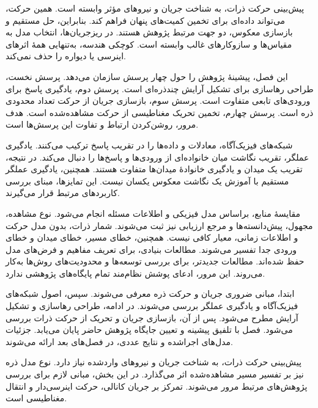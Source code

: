 \label{ch:literature-review}

\label{sec:lit-review-introduction}

پیش‌بینی حرکت ذرات، به شناخت جریان و نیروهای مؤثر وابسته است.
همین حرکت، می‌تواند داده‌ای برای تخمین کمیت‌های پنهان فراهم کند.
بنابراین، حل مستقیم و بازسازی معکوس، دو جهت مرتبط پژوهش هستند.
در ریزجریان‌ها، انتخاب مدل به مقیاس‌ها و سازوکارهای غالب وابسته است.
کوچکی هندسه، به‌تنهایی همهٔ اثرهای اینرسی یا دیواره را حذف نمی‌کند.
\cite{SquiresQuake2005}

این فصل، پیشینهٔ پژوهش را حول چهار پرسش سازمان می‌دهد.
پرسش نخست، طراحی رهاسازی برای تشکیل آرایش چندذره‌ای است.
پرسش دوم، یادگیری پاسخ برای ورودی‌های تابعی متفاوت است.
پرسش سوم، بازسازی جریان از حرکت تعداد محدودی ذره است.
پرسش چهارم، تخمین تحریک مغناطیسی از حرکت مشاهده‌شده است.
هدف مرور، روشن‌کردن ارتباط و تفاوت این پرسش‌ها است.

شبکه‌های فیزیک‌آگاه، معادلات و داده‌ها را در تقریب پاسخ ترکیب می‌کنند.
یادگیری عملگر، تقریب نگاشت میان خانواده‌ای از ورودی‌ها و پاسخ‌ها را دنبال می‌کند.
در نتیجه، تقریب یک میدان و یادگیری خانوادهٔ میدان‌ها متفاوت هستند.
همچنین، یادگیری عملگر مستقیم با آموزش یک نگاشت معکوس یکسان نیست.
این تمایزها، مبنای بررسی کاربردهای مرتبط قرار می‌گیرند.
\cite{Raissi2019PINN,Kovachki2023NeuralOperator}

مقایسهٔ منابع، براساس مدل فیزیکی و اطلاعات مسئله انجام می‌شود.
نوع مشاهده، مجهول، پیش‌دانسته‌ها و مرجع ارزیابی نیز ثبت می‌شوند.
شمار ذرات، بدون مدل حرکت و اطلاعات زمانی، معیار کافی نیست.
همچنین، خطای مسیر، خطای میدان و خطای ورودی جدا تفسیر می‌شوند.
مطالعات بنیادی، برای تعریف مفاهیم و فرض‌های مدل حفظ شده‌اند.
مطالعات جدیدتر، برای بررسی توسعه‌ها و محدودیت‌های روش‌ها به‌کار می‌روند.
این مرور، ادعای پوشش نظام‌مند تمام پایگاه‌های پژوهشی ندارد.

ابتدا، مبانی ضروری جریان و حرکت ذره معرفی می‌شوند.
سپس، اصول شبکه‌های فیزیک‌آگاه و یادگیری عملگر بررسی می‌شوند.
در ادامه، طراحی رهاسازی و تشکیل آرایش مطرح می‌شود.
پس از آن، بازسازی جریان و تحریک از حرکت ذرات بررسی می‌شود.
فصل با تلفیق پیشینه و تعیین جایگاه پژوهش حاضر پایان می‌یابد.
جزئیات مدل‌های اجراشده و نتایج عددی، در فصل‌های بعد ارائه می‌شوند.

\label{sec:lit-flow-particle-foundations}

پیش‌بینی حرکت ذرات، به شناخت جریان و نیروهای واردشده نیاز دارد.
نوع مدل ذره نیز بر تفسیر مسیر مشاهده‌شده اثر می‌گذارد.
در این بخش، مبانی لازم برای بررسی پژوهش‌های مرتبط مرور می‌شوند.
تمرکز بر جریان کانالی، حرکت اینرسی‌دار و انتقال مغناطیسی است.

